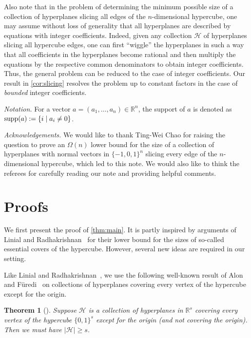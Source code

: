 \documentclass{amsart}
\newtheorem{theorem}{Theorem}
\theoremstyle{remark}
\numberwithin{theorem}{section}
\renewcommand{\(}{\bigl(}
\renewcommand{\)}{\bigr)\vphantom{)}}
\newcommand{\cH}{\mathcal H}
\renewcommand{\ge}{\geqslant}
\newcommand{\R}{\mathbb R}
\newcommand{\bin}{\{0,1\}}
\newcommand{\supp}{\textup{supp}}
\begin{document}
Also note that in the problem of determining the minimum possible size of a collection of hyperplanes slicing all edges of the $n$-dimensional hypercube, one may assume without loss of generality that all hyperplanes are described by equations with integer coefficients. Indeed, given any collection $\cH$ of hyperplanes slicing all hypercube edges, one can first ``wiggle'' the hyperplanes in such a way that all coefficients in the hyperplanes become rational and then multiply the equations by the respective common denominators to obtain integer coefficients. Thus, the general problem can be reduced to the case of integer coefficients. Our result in \cref{cor:slicing} resolves the problem up to constant factors in the case of \emph{bounded} integer coefficients.



\medskip

\noindent \emph{Notation.} For a vector $a = (a_1,\dots, a_n)\in \R^n$, the support of $a$ is denoted as $\supp(a) := \{i \mid a_i\ne 0\}$.

\medskip

\noindent \textit{Acknowledgements.} We would like to thank Ting-Wei Chao for raising the question to prove an $\Omega(n)$ lower bound for the size of a collection of hyperplanes with normal vectors in $\{-1,0,1\}^n$ slicing every edge of the $n$-dimensional hypercube, which led to this note. We would also like to think the referees for carefully reading our note and providing helpful comments.


\section{Proofs}

We first present the proof of \cref{thm:main}. It is partly inspired by arguments of Linial and Radhakrishnan~\cite{LinialR05} for their lower bound for the sizes of so-called essential covers of the hypercube. However, several new ideas are required in our setting.

Like Linial and Radhakrishnan~\cite{LinialR05}, we use the following well-known result of Alon and F\"uredi~\cite{Alon1993Covering} on collections of hyperplanes covering every vertex of the hypercube except for the origin.

\begin{theorem}[\cite{Alon1993Covering}]\label{thm:alon-furedi}
        Suppose $\cH$ is a collection of hyperplanes in $\mathbb{R}^s$ covering every vertex of the hypercube $\bin^s$ except for the origin (and not covering the origin). Then we must have $|\cH|\ge s$.
    \end{theorem}
\end{document}
